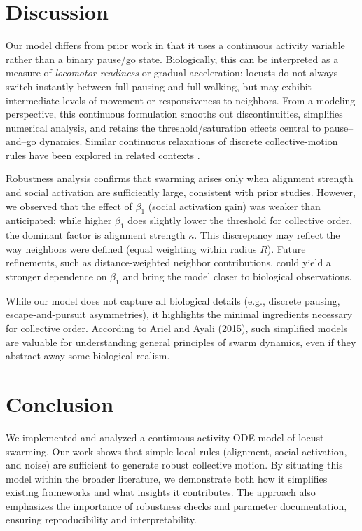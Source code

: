 \documentclass[11pt,a4paper]{article}
\begin{document}
\section{Discussion}

Our model differs from prior work in that it uses a continuous activity variable rather than a binary pause/go state. 
Biologically, this can be interpreted as a measure of \emph{locomotor readiness} or gradual acceleration: locusts do not always switch instantly between full pausing and full walking, but may exhibit intermediate levels of movement or responsiveness to neighbors. 
From a modeling perspective, this continuous formulation smooths out discontinuities, simplifies numerical analysis, and retains the threshold/saturation effects central to pause--and--go dynamics. 
Similar continuous relaxations of discrete collective-motion rules have been explored in related contexts \cite{romanczuk2012active,bialek2012statistical}.


Robustness analysis confirms that swarming arises only when alignment strength and social activation are sufficiently large, consistent with prior studies. 
However, we observed that the effect of $\beta_1$ (social activation gain) was weaker than anticipated: while higher $\beta_1$ does slightly lower the threshold for collective order, the dominant factor is alignment strength $\kappa$. 
This discrepancy may reflect the way neighbors were defined (equal weighting within radius $R$). 
Future refinements, such as distance-weighted neighbor contributions, could yield a stronger dependence on $\beta_1$ and bring the model closer to biological observations.  

While our model does not capture all biological details (e.g., discrete pausing, escape-and-pursuit asymmetries), it highlights the minimal ingredients necessary for collective order. 
According to Ariel and Ayali (2015), such simplified models are valuable for understanding general principles of swarm dynamics, even if they abstract away some biological realism.


\section{Conclusion}

We implemented and analyzed a continuous-activity ODE model of locust swarming. Our work shows that simple local rules (alignment, social activation, and noise) are sufficient to generate robust collective motion. By situating this model within the broader literature, we demonstrate both how it simplifies existing frameworks and what insights it contributes. The approach also emphasizes the importance of robustness checks and parameter documentation, ensuring reproducibility and interpretability.
\end{document}
